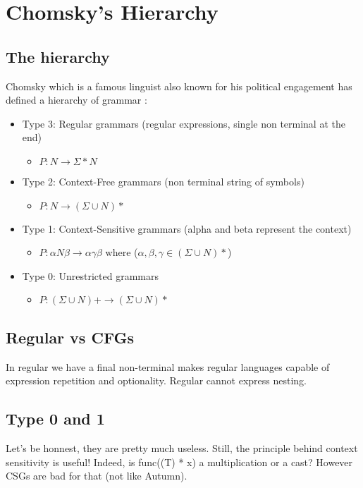 \chapter{Chomsky's Hierarchy}
\label{chap:chomskys_hierarchy}

\section{The hierarchy}
    Chomsky which is a famous linguist also known for his political engagement
    has defined a hierarchy of grammar :
    \begin{itemize}
        \item Type 3: Regular grammars (regular expressions, single non terminal
        at the end)
        \begin{itemize}
            \item $P: N \rightarrow \Sigma * N$
        \end{itemize}
        \item Type 2: Context-Free grammars (non terminal string of symbols)
        \begin{itemize}
            \item $P: N \rightarrow (\Sigma \cup N)*$
        \end{itemize}
        \item Type 1: Context-Sensitive grammars (alpha and beta represent the
        context)
        \begin{itemize}
            \item $P: \alpha N \beta \rightarrow \alpha \gamma \beta$ where
            ($\alpha, \beta, \gamma \in (\Sigma \cup N)*$)
        \end{itemize}
        \item Type 0: Unrestricted grammars
        \begin{itemize}
            \item $P: (\Sigma \cup N)+ \rightarrow (\Sigma \cup N)*$
        \end{itemize}
    \end{itemize}
\section{Regular vs CFGs}
    In regular we have a final non-terminal makes regular languages capable of
    expression repetition and optionality. Regular cannot express nesting.
\section{Type 0 and 1}
    Let's be honnest, they are pretty much useless. Still, the principle behind
    context sensitivity is useful! Indeed, is func((T) * x) a multiplication or
    a cast? However CSGs are bad for that (not like Autumn).

